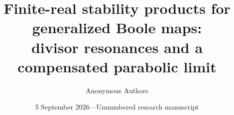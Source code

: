 \documentclass[11pt]{article}
\title{Finite-real stability products for generalized Boole maps:\\
divisor resonances and a compensated parabolic limit}
\author{Anonymous Authors}
\date{5 September 2026\quad---\quad Unnumbered research manuscript}
\theoremstyle{remark}
\numberwithin{equation}{section}
\begin{document}
\maketitle
\begin{abstract}

\end{abstract}








\end{document}
